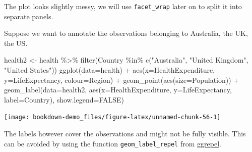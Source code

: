 \documentclass[
]{book}
\newenvironment{Shaded}{\begin{snugshade}}{\end{snugshade}}
\newcommand{\AttributeTok}[1]{\textcolor[rgb]{0.77,0.63,0.00}{#1}}
\newcommand{\ConstantTok}[1]{\textcolor[rgb]{0.00,0.00,0.00}{#1}}
\newcommand{\FunctionTok}[1]{\textcolor[rgb]{0.00,0.00,0.00}{#1}}
\newcommand{\NormalTok}[1]{#1}
\newcommand{\OtherTok}[1]{\textcolor[rgb]{0.56,0.35,0.01}{#1}}
\newcommand{\SpecialCharTok}[1]{\textcolor[rgb]{0.00,0.00,0.00}{#1}}
\newcommand{\StringTok}[1]{\textcolor[rgb]{0.31,0.60,0.02}{#1}}
\begin{document}
The plot looks slightly messy, we will use \texttt{facet\_wrap} later on to split it into separate panels.

Suppose we want to annotate the observations belonging to Australia, the UK, the US.

\begin{Shaded}
\begin{Highlighting}[]
\NormalTok{health2 }\OtherTok{\textless{}{-}}\NormalTok{ health }\SpecialCharTok{\%\textgreater{}\%}
    \FunctionTok{filter}\NormalTok{(Country }\SpecialCharTok{\%in\%} \FunctionTok{c}\NormalTok{(}\StringTok{"Australia"}\NormalTok{, }\StringTok{"United Kingdom"}\NormalTok{, }\StringTok{"United States"}\NormalTok{))}
\FunctionTok{ggplot}\NormalTok{(}\AttributeTok{data=}\NormalTok{health) }\SpecialCharTok{+} 
    \FunctionTok{aes}\NormalTok{(}\AttributeTok{x=}\NormalTok{HealthExpenditure,  }\AttributeTok{y=}\NormalTok{LifeExpectancy, }\AttributeTok{colour=}\NormalTok{Region) }\SpecialCharTok{+}
    \FunctionTok{geom\_point}\NormalTok{(}\FunctionTok{aes}\NormalTok{(}\AttributeTok{size=}\NormalTok{Population)) }\SpecialCharTok{+}
    \FunctionTok{geom\_label}\NormalTok{(}\AttributeTok{data=}\NormalTok{health2, }
               \FunctionTok{aes}\NormalTok{(}\AttributeTok{x=}\NormalTok{HealthExpenditure,  }\AttributeTok{y=}\NormalTok{LifeExpectancy, }\AttributeTok{label=}\NormalTok{Country),}
               \AttributeTok{show.legend=}\ConstantTok{FALSE}\NormalTok{)}
\end{Highlighting}
\end{Shaded}

\texttt{[image: bookdown-demo\_files/figure-latex/unnamed-chunk-56-1]}

The labels however cover the observations and might not be fully visible. This can be avoided by using the function \texttt{geom\_label\_repel} from \href{https://cran.r-project.org/web/packages/ggrepel}{ggrepel}.
\end{document}
